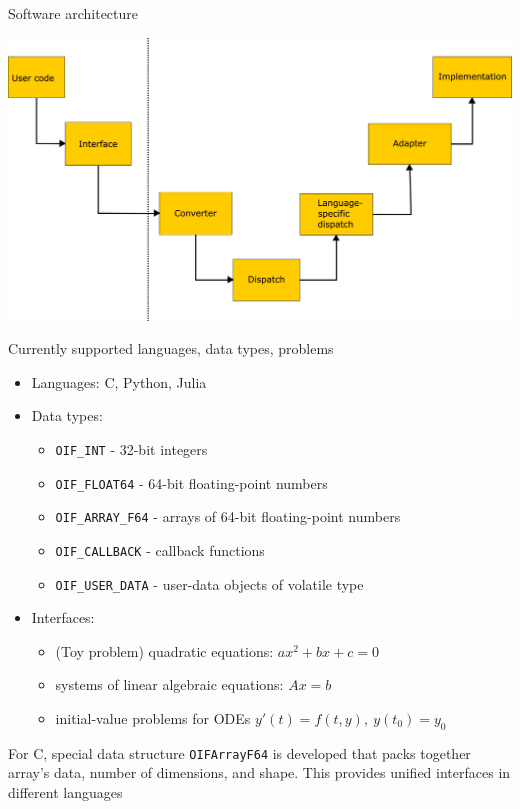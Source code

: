 \documentclass[10pt, aspectratio=169, progressbar=frametitle]{beamer}
\begin{document}
\begin{frame}{Software architecture}
  \begin{center}
    \includegraphics[scale=0.09]{arch.png}
  \end{center}
\end{frame}

\begin{frame}{Currently supported languages, data types, problems}
  \begin{itemize}
    \item Languages: C, Python, Julia
    \item Data types:
          \begin{itemize}
            \item \texttt{OIF\_INT} - 32-bit integers
            \item \texttt{OIF\_FLOAT64} - 64-bit floating-point numbers
            \item \texttt{OIF\_ARRAY\_F64} - arrays of 64-bit floating-point numbers
            \item \texttt{OIF\_CALLBACK} - callback functions
            \item \texttt{OIF\_USER\_DATA} - user-data objects of volatile type
          \end{itemize}
    \item Interfaces:
          \begin{itemize}
            \item (Toy problem) quadratic equations: $ax^2 + bx + c = 0$
            \item systems of linear algebraic equations: $Ax = b$
            \item initial-value problems for ODEs \(y'(t) = f(t, y), \  y(t_0) = y_0\)
          \end{itemize}
  \end{itemize}

  {\small For C, special data structure \texttt{OIFArrayF64} is developed that packs
  together array's data, number of dimensions, and shape.
  This provides unified interfaces in different languages}
\end{frame}
\end{document}
